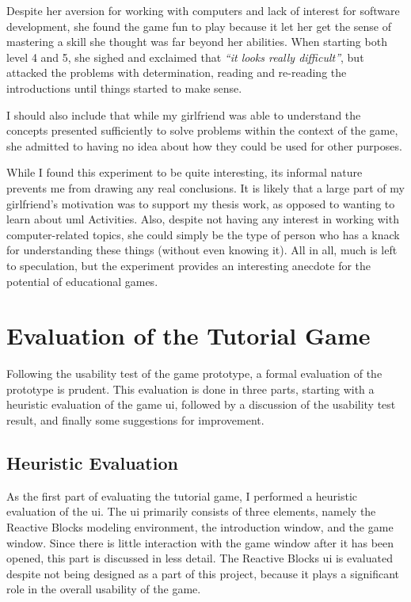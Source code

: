 \noindent
Despite her aversion for working with computers and lack of interest for software development, she found the game fun to play because it let her get the sense of mastering a skill she thought was far beyond her abilities. When starting both level 4 and 5, she sighed and exclaimed that \emph{``it looks really difficult''}, but attacked the problems with determination, reading and re-reading the introductions until things started to make sense.

\noindent
I should also include that while my girlfriend was able to understand the concepts presented sufficiently to solve problems within the context of the game, she admitted to having no idea about how they could be used for other purposes.

\noindent
While I found this experiment to be quite interesting, its informal nature prevents me from drawing any real conclusions. It is likely that a large part of my girlfriend's motivation was to support my thesis work, as opposed to wanting to learn about \gls{uml} Activities. Also, despite not having any interest in working with computer-related topics, she could simply be the type of person who has a knack for understanding these things (without even knowing it). All in all, much is left to speculation, but the experiment provides an interesting anecdote for the potential of educational games.

\section{Evaluation of the Tutorial Game}
\label{sec:game_evaluation}
Following the usability test of the game prototype, a formal evaluation of the prototype is prudent. This evaluation is done in three parts, starting with a heuristic evaluation of the game \gls{ui}, followed by a discussion of the usability test result, and finally some suggestions for improvement.

\subsection{Heuristic Evaluation}
\label{sec:game_heuristic_evaluation}
As the first part of evaluating the tutorial game, I performed a heuristic evaluation of the \gls{ui}. The \gls{ui} primarily consists of three elements, namely the Reactive Blocks modeling environment, the introduction window, and the game window. Since there is little interaction with the game window after it has been opened, this part is discussed in less detail. The Reactive Blocks \gls{ui} is evaluated despite not being designed as a part of this project, because it plays a significant role in the overall usability of the game.

